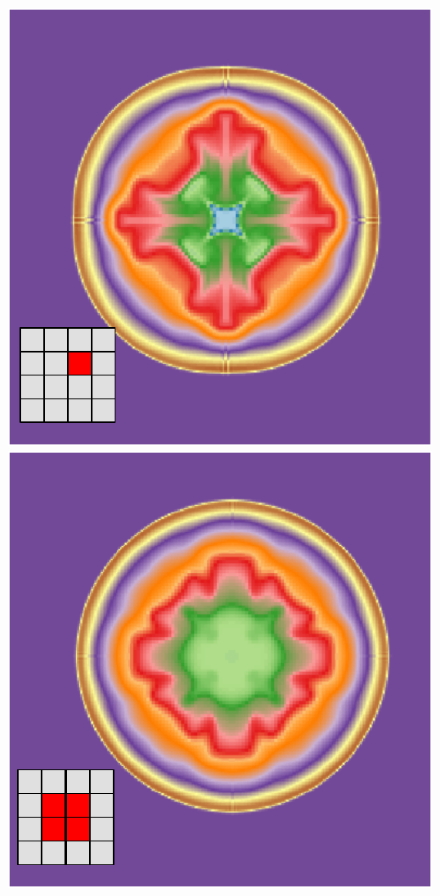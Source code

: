 \begin{figure}[htpb]
        \includegraphics[height=.3\textheight]{img/03/sedov/slice_therm1.pdf} 
		\includegraphics[height=.3\textheight]{img/03/sedov/slice_therm4.pdf} 

\end{figure}
